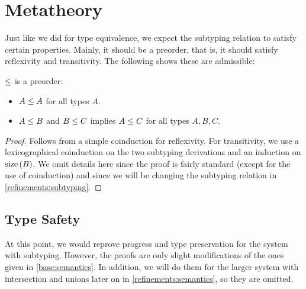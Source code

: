 
\section{Metatheory}

Just like we did for type equivalence, we expect the subtyping relation to satisfy certain properties. Mainly, it should be a preorder, that is, it should satisfy reflexivity and transitivity. The following  shows these are admissible:

\begin{theorem}
  \label{base:sub-is-preorder}
  $\le$ is a preorder:
  \begin{itemize}
    \item $A \le A$ for all types $A$.
    \item $A \le B$ and $B \le C$ implies $A \le C$ for all types $A, B, C$.
  \end{itemize}
\end{theorem}
\begin{proof}
  Follows from a simple coinduction for reflexivity. For transitivity, we use a lexicographical coinduction on the two subtyping derivations and an induction on $\operatorname{size}{(B)}$.  We omit details here since the proof is fairly standard (except for the use of coinduction) and since we will be changing the subtyping relation in \cref{refinements:subtyping}.
\end{proof}


\subsection{Type Safety}

At this point, we would reprove progress and type preservation for the system with subtyping. However, the proofs are only slight modifications of the ones given in \cref{base:semantics}. In addition, we will do them for the larger system with intersection and unions later on in \cref{refinements:semantics}, so they are omitted.


